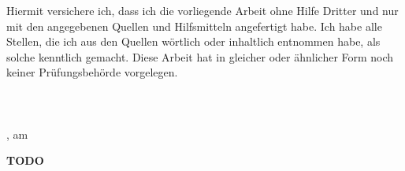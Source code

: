 Hiermit versichere ich, dass ich die vorliegende Arbeit ohne Hilfe Dritter und nur mit den angegebenen Quellen und
Hilfsmitteln angefertigt habe. Ich habe alle Stellen, die ich aus den Quellen wörtlich oder inhaltlich entnommen habe,
als solche kenntlich gemacht. Diese Arbeit hat in gleicher oder ähnlicher Form noch keiner Prüfungsbehörde vorgelegen.\\
\\
\\
\\
\ort, am \datum

	\textbf{TODO}
